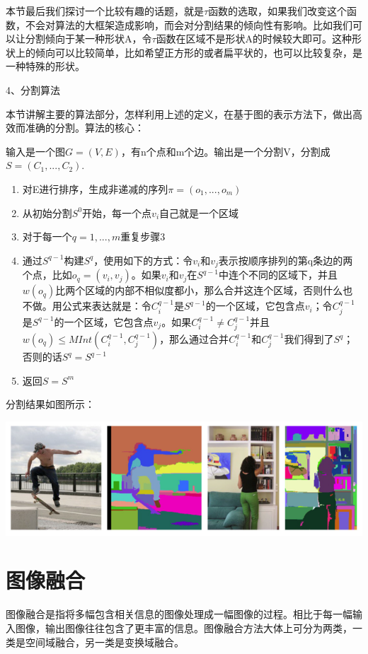 本节最后我们探讨一个比较有趣的话题，就是\(\tau\)函数的选取，如果我们改变这个函数，不会对算法的大框架造成影响，而会对分割结果的倾向性有影响。比如我们可以让分割倾向于某一种形状A，令\(\tau\)函数在区域不是形状A的时候较大即可。这种形状上的倾向可以比较简单，比如希望正方形的或者扁平状的，也可以比较复杂，是一种特殊的形状。

4、分割算法

本节讲解主要的算法部分，怎样利用上述的定义，在基于图的表示方法下，做出高效而准确的分割。算法的核心：

输入是一个图\(G=(V,E)\)，有n个点和m个边。输出是一个分割V，分割成\(S=(C_1,...,C_2).\)

\begin{enumerate}
\item 对E进行排序，生成非递减的序列\(\pi = (o_1,...,o_m)\)
\item 从初始分割\(S^0\)开始，每一个点\(v_i\)自己就是一个区域
\item 对于每一个\(q = 1,...,m\)重复步骤3
\item 通过\(S^{q-1}\)构建\(S^q\)，使用如下的方式：令\(v_i\)和\(v_j\)表示按顺序排列的第q条边的两个点，比如\(o_q = (v_i,v_j)\)。如果\(v_i\)和\(v_j\)在\(S^{q-1}\)中连个不同的区域下，并且\(w(o_q)\)比两个区域的内部不相似度都小，那么合并这连个区域，否则什么也不做。用公式来表达就是：令\(C_{i}^{q-1}\)是\(S^{q-1}\)的一个区域，它包含点\(v_i\)；令\(C_{j}^{q-1}\)是\(S^{q-1}\)的一个区域，它包含点\(v_j\)。如果\(C_{i}^{q-1} \neq C_{j}^{q-1}\)并且\(w(o_q) \leq MInt(C_i^{q-1},C_j^{q-1})\)，那么通过合并\(C_{i}^{q-1}\)和\(C_{j}^{q-1}\)我们得到了\(S^q\)；否则的话\(S^q = S^{q-1}\)
\item 返回\(S = S^m\)
\end{enumerate}

分割结果如图所示：

\includegraphics[width=15.00cm]{imgs/ch2/segment}

\section{图像融合}

图像融合是指将多幅包含相关信息的图像处理成一幅图像的过程。相比于每一幅输入图像，输出图像往往包含了更丰富的信息。图像融合方法大体上可分为两类，一类是空间域融合，另一类是变换域融合。

